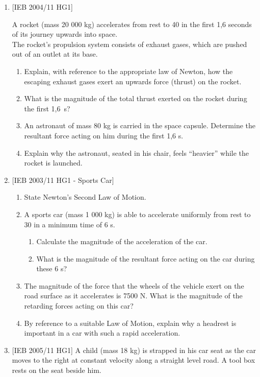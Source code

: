 \begin{eocexercises}{}
\begin{enumerate}
\item{[IEB 2004/11 HG1]

A rocket (mass 20 000 kg) accelerates from rest to 40 \ms in the first 1,6 seconds of its journey upwards into space.\\
The rocket's propulsion system consists of exhaust gases, which are pushed out of an outlet at its base.
\begin{enumerate}
\item{Explain, with reference to the appropriate law of Newton, how the escaping exhaust gases exert an upwards force (thrust) on the rocket.}
\item{What is the magnitude of the total thrust exerted on the rocket during the first 1,6~s?}
\item{An astronaut of mass 80 kg is carried in the space capsule. Determine the resultant force acting on him during the first 1,6 s.}
\item{Explain why the astronaut, seated in his chair, feels ``heavier'' while the rocket is launched.}
\end{enumerate}}

\item{[IEB 2003/11 HG1 - Sports Car]

\begin{enumerate}
\item{State Newton's Second Law of Motion.}
\item{A sports car (mass 1 000 kg) is able to accelerate uniformly from rest to 30 \ms in a minimum time of 6 s.
\begin{enumerate}
\item{Calculate the magnitude of the acceleration of the car.}
\item{What is the magnitude of the resultant force acting on the car during these 6 s?}
\end{enumerate}}

\item{The magnitude of the force that the wheels of the vehicle exert on the road surface as it accelerates is 7500 N. What is the magnitude of the retarding forces acting on this car?}

\item{By reference to a suitable Law of Motion, explain why a headrest is important in a car with such a rapid acceleration.}
\end{enumerate}}

\item{[IEB 2005/11 HG1]
A child (mass 18 kg) is strapped in his car seat as the car moves to the right at constant velocity along a straight level road. A tool box rests on the seat beside him.

}
\end{enumerate}
\end{eocexercises}
